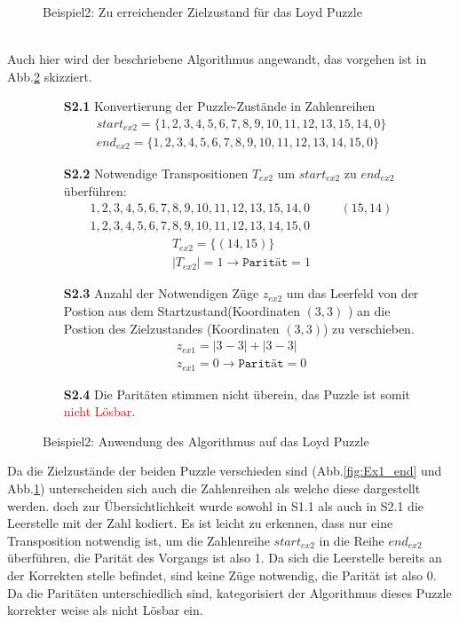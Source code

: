 \begin{minipage}{\linewidth}
\begin{minipage}[t]{0.45\linewidth}
\begin{figure}[H]
			\captionsetup{format=plain, indention=0pt}
			\caption{\label{fig:Ex2_end}Beispiel2: Zu erreichender Zielzustand für das Loyd Puzzle}
		\end{figure}
	\end{minipage}
\end{minipage}\\\WNL%
Auch hier wird der beschriebene Algorithmus angewandt, das vorgehen ist in Abb.\ref{fig:Ex2_algo} skizziert.
\begin{figure}[H]
	\begin{enumerate}
		\item[\textbf{S2.1}] Konvertierung der Puzzle-Zustände in Zahlenreihen
		\begin{align*}
		start_{ex2} = \{1,2,3,4,5,6,7,8,9,10,11,12,13,15,14,0\} \\
		end_{ex2} = \{1,2,3,4,5,6,7,8,9,10,11,12,13,14,15,0\}
		\end{align*}
		\item[\textbf{S2.2}] Notwendige Transpositionen $T_{ex2}$ um $start_{ex2}$ zu $end_{ex2}$ überführen:
		\begin{align*}		
		1,2,3,4,5,6,7,8,9,10,11,12,13,15,14,0&\hspace{20pt} (15,14)\\
		1,2,3,4,5,6,7,8,9,10,11,12,13,14,15,0&
		\end{align*}
		\begin{align*}
		T_{ex2} = \{(14,15)\}\\
		\left\vert T_{ex2}\right\vert = 1 \rightarrow \texttt{Parität} = 1	
		\end{align*}
		\item[\textbf{S2.3}] Anzahl der Notwendigen Züge $z_{ex2}$ um das Leerfeld von der Postion aus dem Startzustand(Koordinaten $(3,3)$ ) an die Postion des Zielzustandes (Koordinaten $(3,3)$) zu verschieben.
		\begin{align*}		
		z_{ex1} = \left | 3 - 3 \right | + \left | 3 - 3 \right |\\
		z_{ex1} = 0 \rightarrow \texttt{Parität} = 0
		\end{align*}	
		\item[\textbf{S2.4}] Die Paritäten stimmen nicht überein, das Puzzle ist somit \textcolor{red}{nicht Lösbar}.	
	\end{enumerate}
	\caption{Beispiel2: Anwendung des Algorithmus auf das Loyd Puzzle \label{fig:Ex2_algo}}
\end{figure}
Da die Zielzustände der beiden Puzzle verschieden sind (Abb.\ref{fig:Ex1_end} und Abb.\ref{fig:Ex2_end}) unterscheiden sich auch die Zahlenreihen als welche diese dargestellt werden. doch zur Übersichtlichkeit wurde sowohl in S1.1 als auch in S2.1 die Leerstelle mit der Zahl  kodiert. Es ist leicht zu erkennen, dass nur eine Transposition notwendig ist, um die Zahlenreihe $start_{ex2}$ in die Reihe $end_{ex2}$ überführen, die Parität des Vorgangs ist also 1. Da sich die Leerstelle bereits an der Korrekten stelle befindet, sind keine Züge notwendig, die Parität ist also 0. Da die Paritäten unterschiedlich sind, kategorisiert der Algorithmus dieses Puzzle korrekter weise als  nicht Lösbar ein.\WNL

